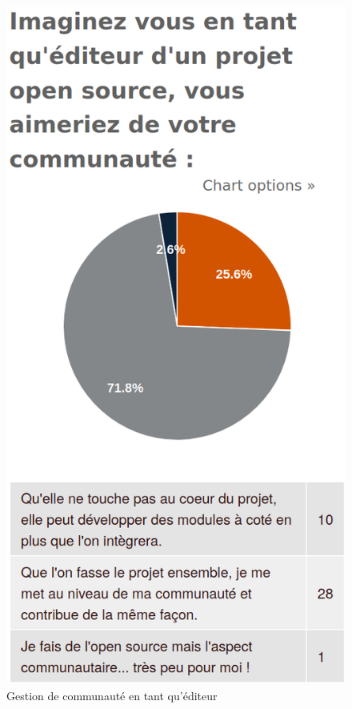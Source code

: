 			\begin{figure}[!htb]
				\center
				\includegraphics[scale=0.28]{./img/gestioncommunaute}
				\caption{Gestion de communauté en tant qu'éditeur}
			\end{figure}

